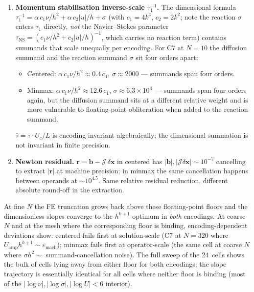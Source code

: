 \documentclass[11pt]{article}
\begin{document}
\begin{enumerate}
      Both encodings produce the same dimensionless $\hat{\boldsymbol{\pi}}_h$
      \emph{exactly} (the dimensional rescaling cancels term by term),
      but the round-off in computing the dimensional $R$ as a sum of
      four contributions at different magnitudes accumulates
      differently. The relative position of summands in log-space
      changes between encodings, and Float64 cancels the smaller
      ones differently when summed with the larger ones.
\item \textbf{Momentum stabilisation inverse-scale $\tau_1^{-1}$.} The
      dimensional formula
      $\tau_1^{-1} = \alpha\,c_1 \nu / h^2 + \alpha\,c_2 |u|/h + \sigma$
      (with $c_1 = 4k^4$, $c_2 = 2k^2$; note the reaction $\sigma$ enters
      $\tau_1$ directly, \emph{not} the Navier--Stokes parameter
      $\tau_{\mathrm{NS}} = (c_1 \nu / h^2 + c_2 |u|/h)^{-1}$, which carries no
      reaction term) contains summands that scale unequally per encoding.
      For C7 at $N=10$ the diffusion summand and the reaction summand
      $\sigma$ sit four orders apart:
      \begin{itemize}
      \item Centered: $\alpha\,c_1 \nu / h^2 \approx 0.4\,c_1$, $\sigma \approx 2000$ — summands span four orders.
      \item Minmax:   $\alpha\,c_1 \nu / h^2 \approx 12.6\,c_1$, $\sigma \approx 6.3 \times 10^4$ — summands span four orders again, but the diffusion summand sits at a different relative weight and is more vulnerable to floating-point obliteration when added to the reaction summand.
      \end{itemize}
      $\hat{\tau} = \tau \cdot U_c / L$ is encoding-invariant
      algebraically; the dimensional summation is not invariant in
      finite precision.
\item \textbf{Newton residual.} $\boldsymbol{r} = \boldsymbol{b} -
      \mathcal{J}\, \delta\boldsymbol{x}$ in centered has
      $|\boldsymbol{b}|, |\mathcal{J} \delta\boldsymbol{x}| \sim 10^{-7}$
      cancelling to extract $|\boldsymbol{r}|$ at machine precision; in
      minmax the same cancellation happens between operands at $\sim
      10^{4.5}$. Same relative residual reduction, different absolute
      round-off in the extraction.
\end{enumerate}

\noindent At fine $N$ the FE truncation grows back above these
floating-point floors and the dimensionless slopes converge to the
$h^{k+1}$ optimum in \emph{both} encodings. At coarse $N$ and at the
mesh where the corresponding floor is binding, encoding-dependent
deviations show: centered fails first at solution-scale (C7 at $N=320$
where $U_{\mathrm{amp}} h^{k+1} \sim \varepsilon_{\mathrm{mach}}$); minmax
fails first at operator-scale (the same cell at coarse $N$ where
$\sigma h^2 \sim$ summand-cancellation noise). The full sweep of the
24~cells shows the bulk of cells lying away from either floor for both
encodings; the slope trajectory is essentially identical for all cells
where neither floor is binding (most of the
$|\log\nu|, |\log\sigma|, |\log U| < 6$ interior).
\end{document}
